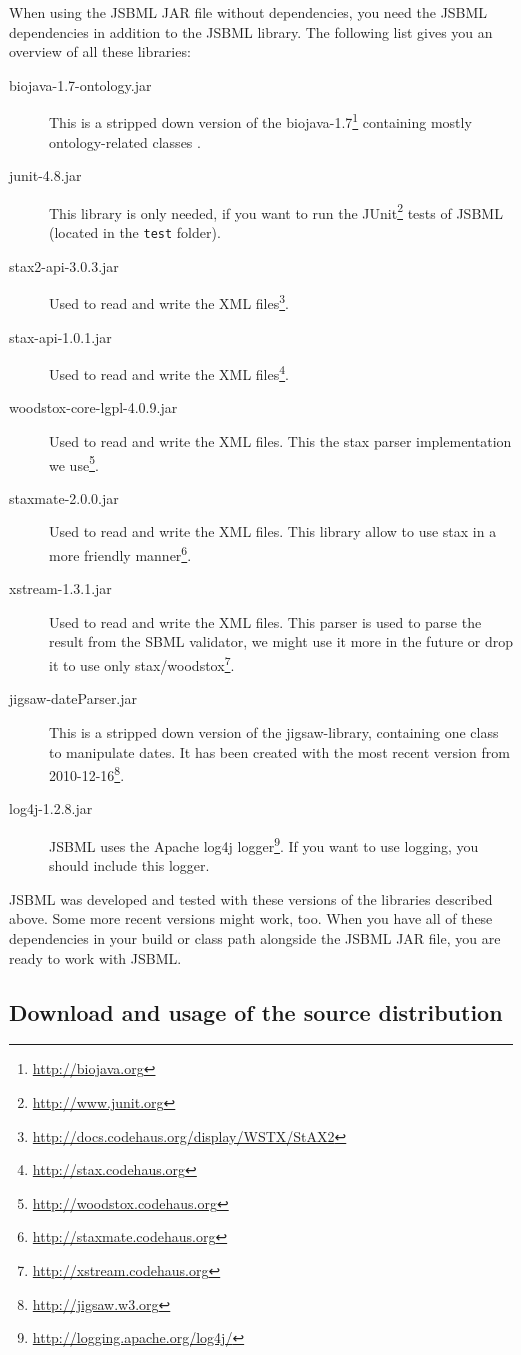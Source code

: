 When using the JSBML JAR file without dependencies, you need the JSBML
dependencies in addition to the JSBML library. The following list gives you an
overview of all these libraries:
\begin{description}
\item[biojava-1.7-ontology.jar] This is a stripped down version of the
biojava-1.7\footnote{\url{http://biojava.org}} containing mostly
ontology-related classes \citep{Holland2008}.
\item[junit-4.8.jar]This library is only needed, if you want to run the
JUnit\footnote{\url{http://www.junit.org}} tests of JSBML (located in the
\texttt{test} folder).
\item[stax2-api-3.0.3.jar] Used to read and write the XML
files\footnote{\url{http://docs.codehaus.org/display/WSTX/StAX2}}.
\item[stax-api-1.0.1.jar] Used to read and write the XML
files\footnote{\url{http://stax.codehaus.org}}.
\item[woodstox-core-lgpl-4.0.9.jar] Used to read and write the XML files. This
the stax parser implementation we
use\footnote{\url{http://woodstox.codehaus.org}}.
\item[staxmate-2.0.0.jar] Used to read and write the XML files. This library
allow to use stax in a more friendly
manner\footnote{\url{http://staxmate.codehaus.org}}.
\item[xstream-1.3.1.jar] Used to read and write the XML files. This parser is
used to parse the result from the SBML validator, we might use it more in the
future or drop it to use only
stax/woodstox\footnote{\url{http://xstream.codehaus.org}}.
\item[jigsaw-dateParser.jar] This is a stripped down version of the
jigsaw-library, containing one class to manipulate dates. It has been created
with the most recent version from
2010-12-16\footnote{\url{http://jigsaw.w3.org}}.
\item[log4j-1.2.8.jar] JSBML uses the Apache log4j
logger\footnote{\url{http://logging.apache.org/log4j/}}. If you want to use
logging, you should include this logger.
\end{description}
JSBML was developed and tested with these versions of the libraries described
above. Some more recent versions might work, too. When you have all of these
dependencies in your build or class path alongside the JSBML JAR file, you are
ready to work with JSBML.


\subsection{Download and usage of the source distribution}

